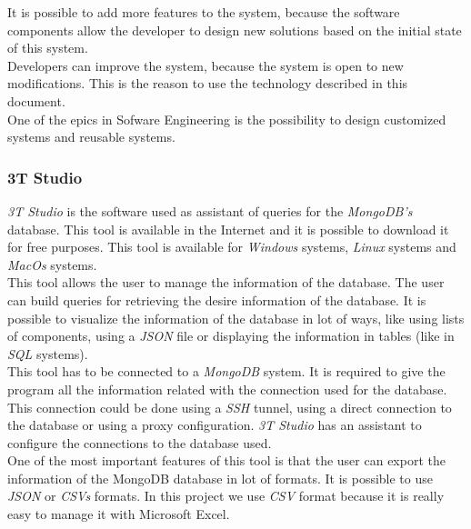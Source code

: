 It is possible to add more features to the system, because the software components allow the developer to design new solutions based on the initial state of this system.\\

Developers can improve the system, because the system is open to new modifications. This is the reason to use the technology described in this document.\\

One of the epics in Sofware Engineering is the possibility to design customized systems and reusable systems.

\subsubsection{3T Studio}

\textit{3T Studio} is the software used as assistant of queries for the \textit{MongoDB's} database. This tool is available in the Internet and it is possible to download it for free purposes. This tool is available for \textit{Windows} systems, \textit{Linux} systems and \textit{MacOs} systems.\\

This tool allows the user to manage the information of the database. The user can build queries for retrieving the desire information of the database. It is possible to visualize the information of the database in lot of ways, like using lists of components, using a \textit{JSON} file or displaying the information in tables (like in \textit{SQL} systems).\\

This tool has to be connected to a \textit{MongoDB} system. It is required to give the program all the information related with the connection used for the database. This connection could be done using a \textit{SSH} tunnel, using a direct connection to the database or using a proxy configuration. \textit{3T Studio} has an assistant to configure the connections to the database used.\\

One of the most important features of this tool is that the user can export the information of the MongoDB database in lot of formats. It is possible to use \textit{JSON} or \textit{CSVs} formats. In this project we use \textit{CSV} format because it is really easy to manage it with Microsoft Excel.

